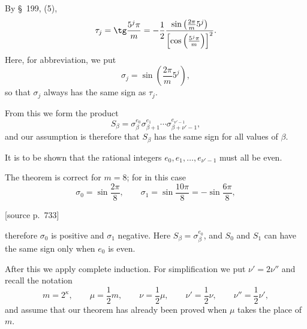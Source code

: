 \documentclass[11pt]{article}
\newcommand{\srcpage}[1]{\par\medskip\noindent\textsf{[source p.~#1]}\par\smallskip}
\begin{document}
By \S~199, (5),
\[
\tau_j=\tg\frac{5^j\pi}{m}=-\frac12\frac{\sin\left(\frac{2\pi}{m}5^j\right)}{\left[\cos\left(\frac{5^j\pi}{m}\right)\right]^2}.
\]
Here, for abbreviation, we put
\begin{equation}
\sigma_j=\sin\left(\frac{2\pi}{m}5^j\right),
\tag{14}
\end{equation}
so that $\sigma_j$ always has the same sign as $\tau_j$.

From this we form the product
\begin{equation}
S_\beta=\sigma_\beta^{e_0}\sigma_{\beta+1}^{e_1}\cdots\sigma_{\beta+\nu'-1}^{e_{\nu'-1}},
\tag{15}
\end{equation}
and our assumption is therefore that $S_\beta$ has the same sign for all values of $\beta$.

It is to be shown that the rational integers $e_0,e_1,\ldots,e_{\nu'-1}$ must all be even.

The theorem is correct for $m=8$; for in this case
\[
\sigma_0=\sin\frac{2\pi}{8},\qquad \sigma_1=\sin\frac{10\pi}{8}=-\sin\frac{6\pi}{8},
\]
\srcpage{733}
therefore $\sigma_0$ is positive and $\sigma_1$ negative. Here $S_\beta=\sigma_\beta^{e_0}$, and $S_0$ and $S_1$ can have the same sign only when $e_0$ is even.

After this we apply complete induction. For simplification we put $\nu'=2\nu''$ and recall the notation
\begin{equation}
m=2^\kappa,\qquad \mu=\frac12m,\qquad \nu=\frac12\mu,
\qquad \nu'=\frac12\nu,
\qquad \nu''=\frac12\nu',
\tag{16}
\end{equation}
and assume that our theorem has already been proved when $\mu$ takes the place of $m$.
\end{document}
